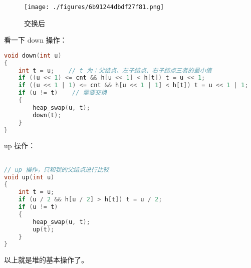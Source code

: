 \begin{figure}[ht]
\centering
\texttt{[image: ./figures/6b91244dbdf27f81.png]}
\caption{交换后} \label{fig_heap_2}
\end{figure}


看一下 down 操作：

\begin{lstlisting}[language=cpp]
void down(int u)
{
    int t = u;    // t 为：父结点、左子结点、右子结点三者的最小值
    if ((u << 1) <= cnt && h[u << 1] < h[t]) t = u << 1;
    if ((u << 1 | 1) <= cnt && h[u << 1 | 1] < h[t]) t = u << 1 | 1;
    if (u != t)    // 需要交换
    {
        heap_swap(u, t);
        down(t);
    }
}
\end{lstlisting}

up 操作：

\begin{lstlisting}[language=cpp]

// up 操作，只和我的父结点进行比较
void up(int u)
{
    int t = u;
    if (u / 2 && h[u / 2] > h[t]) t = u / 2;
    if (u != t)
    {
        heap_swap(u, t);
        up(t);
    }
}
\end{lstlisting}

以上就是堆的基本操作了。

